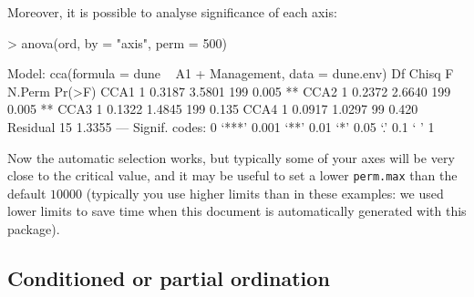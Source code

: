 \documentclass[a4paper,10pt]{amsart}
\begin{document}
Moreover, it is possible to analyse significance of each axis:
\begin{Schunk}
\begin{Sinput}
> anova(ord, by = "axis", perm = 500)
\end{Sinput}
\begin{Soutput}
Model: cca(formula = dune ~ A1 + Management, data = dune.env)
         Df  Chisq      F N.Perm Pr(>F)   
CCA1      1 0.3187 3.5801    199  0.005 **
CCA2      1 0.2372 2.6640    199  0.005 **
CCA3      1 0.1322 1.4845    199  0.135   
CCA4      1 0.0917 1.0297     99  0.420   
Residual 15 1.3355                        
---
Signif. codes:  0 ‘***’ 0.001 ‘**’ 0.01 ‘*’ 0.05 ‘.’ 0.1 ‘ ’ 1 
\end{Soutput}
\end{Schunk}
Now the automatic selection works, but typically some of your axes
will be very close to the critical value, and it may be useful to set
a lower \texttt{perm.max} than the default $10000$ (typically you use
higher limits than in these examples: we used lower limits to save
time when this document is automatically generated with this package).

\subsection{Conditioned or partial ordination}
\end{document}
